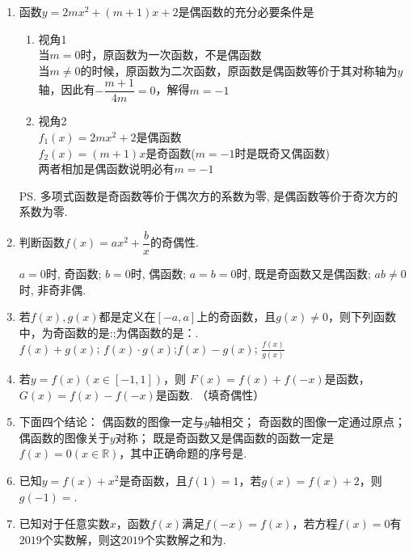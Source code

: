 \begin{enumerate}
    \item 函数$y=2m x^2+(m+1)x+2$是偶函数的充分必要条件是
    \begin{jieda}
        \begin{enumerate}
            \item 视角1 \\
            当$m = 0$时，原函数为一次函数，不是偶函数\\
            当$m \neq 0$的时候，原函数为二次函数，原函数是偶函数等价于其对称轴为$y$轴，因此有$- \dfrac{m+1}{4m} = 0$，解得$m = -1$
            \item 视角2 \\
             $f_1(x) = 2m x^2 + 2$是偶函数 \\
             $f_2(x) = (m+1)x$是奇函数($m = -1$时是既奇又偶函数) \\
             两者相加是偶函数说明必有$m = -1$
        \end{enumerate}
        \ps 多项式函数是奇函数等价于偶次方的系数为零, 是偶函数等价于奇次方的系数为零.
    \end{jieda}
    \item 判断函数$f(x)=ax^2+\dfrac{b}{x}$的奇偶性. 
    \begin{jieda}
        $a=0$时, 奇函数; $b=0$时, 偶函数; $a=b=0$时, 既是奇函数又是偶函数; $ab\neq 0$时, 非奇非偶.
    \end{jieda}
    \item 若$f(x),g(x)$都是定义在$[-a,a]$上的奇函数，且$g(x) \neq 0$，则下列函数中，为奇函数的是:;为偶函数的是：. \\
    $f(x)+g(x)$;  $f(x)\cdot g(x)$;$f(x)-g(x)$; $\frac{f(x)}{g(x)}$
    
    \item 若$y=f(x) (x\in [-1,1])$，则 $F(x)=f(x)+f(-x)$是函数，$G(x)=f(x)-f(-x)$是函数. （填奇偶性）
    
    \item 下面四个结论： 偶函数的图像一定与$y$轴相交； 奇函数的图像一定通过原点；偶函数的图像关于$y$对称； 既是奇函数又是偶函数的函数一定是$f(x)=0(x\in \mathbb{R})$，其中正确命题的序号是.

    \item 已知$y=f(x)+x^2$是奇函数，且$f(1)=1$，若$g(x)=f(x)+2$，则$g(-1)=$.
    
    \item 已知对于任意实数$x$，函数$f(x)$满足$f(-x)=f(x)$，若方程$f(x)=0$有$2019$个实数解，则这$2019$个实数解之和为.


\end{enumerate}
